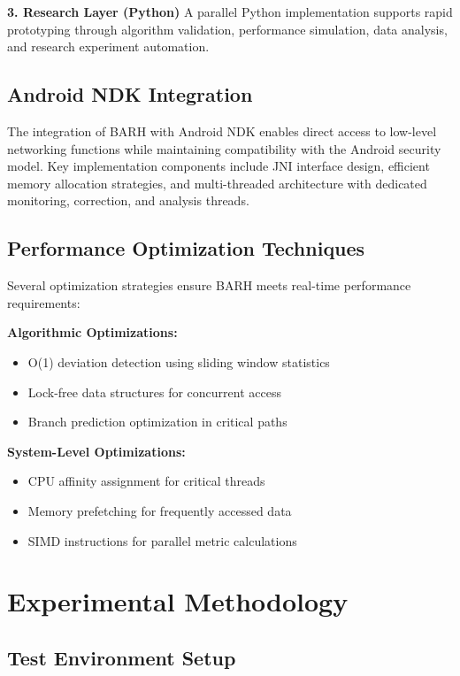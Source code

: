 \documentclass[conference]{IEEEtran}
\begin{document}
\textbf{3. Research Layer (Python)}
A parallel Python implementation supports rapid prototyping through algorithm validation, performance simulation, data analysis, and research experiment automation.

\subsection{Android NDK Integration}

The integration of BARH with Android NDK enables direct access to low-level networking functions while maintaining compatibility with the Android security model. Key implementation components include JNI interface design, efficient memory allocation strategies, and multi-threaded architecture with dedicated monitoring, correction, and analysis threads.

\subsection{Performance Optimization Techniques}

Several optimization strategies ensure BARH meets real-time performance requirements:

\textbf{Algorithmic Optimizations:}
\begin{itemize}
\item O(1) deviation detection using sliding window statistics
\item Lock-free data structures for concurrent access
\item Branch prediction optimization in critical paths
\end{itemize}

\textbf{System-Level Optimizations:}
\begin{itemize}
\item CPU affinity assignment for critical threads
\item Memory prefetching for frequently accessed data
\item SIMD instructions for parallel metric calculations
\end{itemize}

\section{Experimental Methodology}

\subsection{Test Environment Setup}
\end{document}
